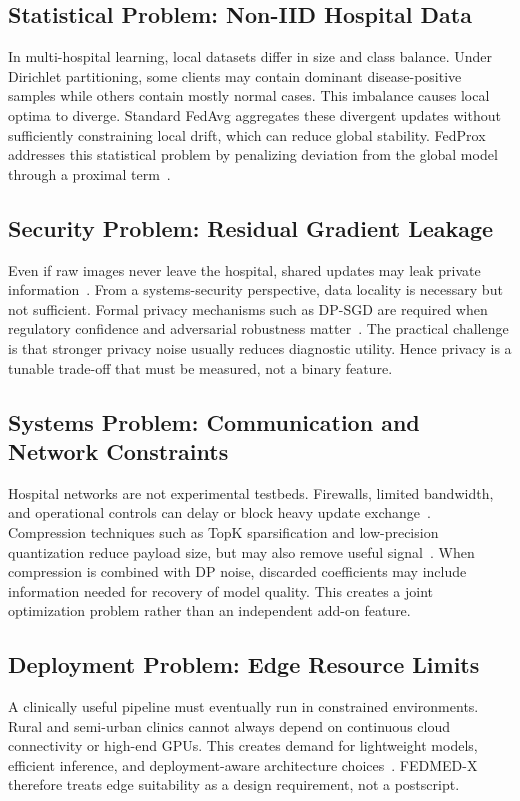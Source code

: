 \subsection{Statistical Problem: Non-IID Hospital Data}
In multi-hospital learning, local datasets differ in size and class balance.
Under Dirichlet partitioning, some clients may contain dominant
disease-positive samples while others contain mostly normal cases. This
imbalance causes local optima to diverge. Standard FedAvg aggregates these
divergent updates without sufficiently constraining local drift, which can
reduce global stability. FedProx addresses this statistical problem by
penalizing deviation from the global model through a proximal
term~\cite{li2020fedprox,riyadi2026comparative,yuan2022convergence}.

\subsection{Security Problem: Residual Gradient Leakage}
Even if raw images never leave the hospital, shared updates may leak private
information~\cite{koutsoubis2024future,wei2025medical}. From a
systems-security perspective, data locality is necessary but not sufficient.
Formal privacy mechanisms such as DP-SGD are required when regulatory
confidence and adversarial robustness matter~\cite{abadi2016deep,
ziller2021differentially}. The practical challenge is that stronger privacy
noise usually reduces diagnostic utility. Hence privacy is a tunable
trade-off that must be measured, not a binary feature.

\subsection{Systems Problem: Communication and Network Constraints}
Hospital networks are not experimental testbeds. Firewalls, limited
bandwidth, and operational controls can delay or block heavy update
exchange~\cite{bujotzek2024real,schoenpflug2025navigating}. Compression
techniques such as TopK sparsification and low-precision quantization reduce
payload size, but may also remove useful signal~\cite{habib2025cflsparsemed,
asad2024fesec}. When compression is combined with DP noise, discarded
coefficients may include information needed for recovery of model quality.
This creates a joint optimization problem rather than an independent add-on
feature.

\subsection{Deployment Problem: Edge Resource Limits}
A clinically useful pipeline must eventually run in constrained environments.
Rural and semi-urban clinics cannot always depend on continuous cloud
connectivity or high-end GPUs. This creates demand for lightweight models,
efficient inference, and deployment-aware architecture
choices~\cite{vincent2026federated,shabarinath2025efficacy,memon2024edge}.
FEDMED-X therefore treats edge suitability as a design requirement, not a
postscript.

